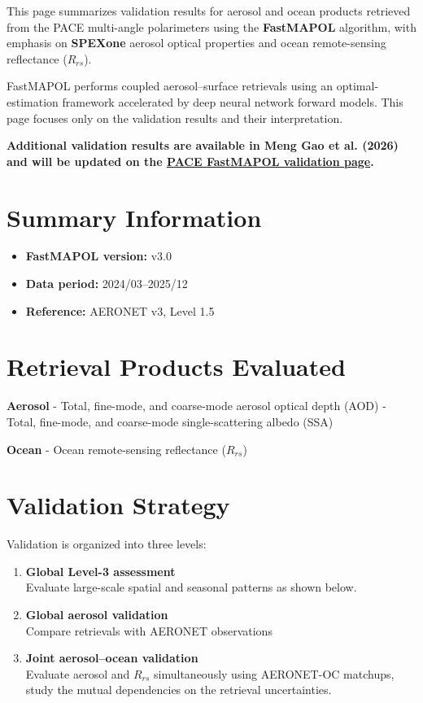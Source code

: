 \documentclass[
  11pt,
  letterpaper,
  DIV=11,
  numbers=noendperiod]{scrreprt}
\providecommand{\tightlist}{%
  \setlength{\itemsep}{0pt}\setlength{\parskip}{0pt}}
\begin{document}
This page summarizes validation results for aerosol and ocean products
retrieved from the PACE multi-angle polarimeters using the
\textbf{FastMAPOL} algorithm, with emphasis on \textbf{SPEXone} aerosol
optical properties and ocean remote-sensing reflectance (\(R_{rs}\)).

FastMAPOL performs coupled aerosol--surface retrievals using an
optimal-estimation framework accelerated by deep neural network forward
models. This page focuses only on the validation results and their
interpretation.

\textbf{Additional validation results are available in Meng Gao et al.
(2026) and will be updated on the
\href{https://pace.oceansciences.org/pace_fastmapol.htm}{PACE FastMAPOL
validation page}.}

\section{Summary Information}\label{summary-information}

\begin{itemize}
\tightlist
\item
  \textbf{FastMAPOL version:} v3.0\\
\item
  \textbf{Data period:} 2024/03--2025/12\\
\item
  \textbf{Reference:} AERONET v3, Level 1.5
\end{itemize}

\section{Retrieval Products
Evaluated}\label{retrieval-products-evaluated}

\textbf{Aerosol} - Total, fine-mode, and coarse-mode aerosol optical
depth (AOD) - Total, fine-mode, and coarse-mode single-scattering albedo
(SSA)

\textbf{Ocean} - Ocean remote-sensing reflectance (\(R_{rs}\))

\section{Validation Strategy}\label{validation-strategy}

Validation is organized into three levels:

\begin{enumerate}
\def\labelenumi{\arabic{enumi}.}
\item
  \textbf{Global Level-3 assessment}\\
  Evaluate large-scale spatial and seasonal patterns as shown below.
\item
  \textbf{Global aerosol validation}\\
  Compare retrievals with AERONET observations
\item
  \textbf{Joint aerosol--ocean validation}\\
  Evaluate aerosol and \(R_{rs}\) simultaneously using AERONET-OC
  matchups, study the mutual dependencies on the retrieval
  uncertainties.
\end{enumerate}
\end{document}
